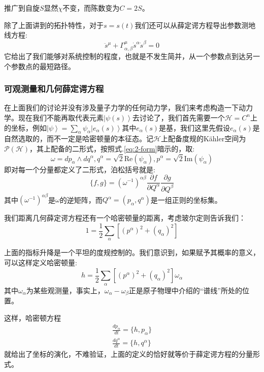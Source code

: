 \documentclass[supercite]{HustGraduPaper}
\newcommand{\ket}[1]{\left| #1 \right\rangle}
\begin{document}
推广到自旋$S$显然$\chi$不变，而陈数变为$C = 2S$。

除了上面讲到的拓扑特性，对于$s = s(t)$我们还可以从薛定谔方程导出参数测地线方程:
\begin{equation}
\ddot{s}^\mu + \Gamma_{\alpha,\beta}^\mu \dot{s}^\alpha \dot{s}^\beta = 0
\end{equation}
它给出了我们能够对系统控制的程度，也就是不发生简并，从一个参数点到达另一个参数点的最短路径。
	\subsubsection{可观测量和几何薛定谔方程}
	在上面我们的讨论并没有涉及量子力学的任何动力学，我们来考虑构造一下动力学。现在我们不能再取代表元素$\ket{\psi(s)}$去讨论了，我们首先需要一个$\mathcal{H} = C^n$上的坐标，例如$\ket{\psi} = \sum_\alpha \psi_{\alpha} \ket{e_\alpha(s)}$其中$e_\alpha(s)$是基，我们这里先假设$e_\alpha(s)$是自然选取的，而不一定是哈密顿量的本征态。记$\mathcal{H}$上配备度规的Kähler空间为$\mathcal{P}(\mathcal{H})$，其上配备的二形式，按照式.\ref{eq:2-form}暗示的，取:
\begin{equation}
\omega = dp_\alpha \wedge dq^\alpha, q^\alpha = \sqrt{2} \text{Re}(\psi_\alpha) , p^\alpha = \sqrt{2}\text{Im}(\psi_\alpha)
\end{equation}
即对每一个分量都定义了二形式，泊松括号就是:
\begin{equation}
\{f,g\} = (\omega^{-1})^{\alpha \beta}\frac{\partial f}{\partial Q^\alpha}\frac{\partial g}{\partial Q^\beta}
\end{equation}
其中$(\omega^{-1})^{\alpha \beta}$是$\omega$的逆矩阵，而$Q^\alpha = (p_\alpha, q^\alpha
)$是一组正则的坐标集。

我们距离几何薛定谔方程还有一个哈密顿量的距离，考虑玻尔定则告诉我们：
\begin{equation}
1 = \frac{1}{2} \sum_\alpha [(p^\alpha)^2 + (q_\alpha)^2]
\end{equation}

上面的指标升降是一个平坦的度规控制的。我们意识到，如果赋予其概率的意义，可以这样定义哈密顿量:
\begin{equation}
\label{eq:hami}
h = \frac{1}{2} \sum_\alpha [(p^\alpha)^2 + (q_\alpha)^2] \omega_\alpha
\end{equation}
	其中$\omega_\alpha$为某些观测量，事实上，$\omega_{\alpha} - \omega_{\beta}$正是原子物理中介绍的“谱线”所处的位置。
	
	这样，哈密顿方程
	\begin{equation}
	\begin{aligned}
	\frac{dp_\alpha}{dt} = \{h,p_\alpha\} \\
	\frac{dq^\alpha}{dt} = \{h,q^\alpha\}
	\end{aligned}
	\end{equation}
	就给出了坐标的演化，不难验证，上面的定义的恰好就等价于薛定谔方程的分量形式。
	
\end{document}
